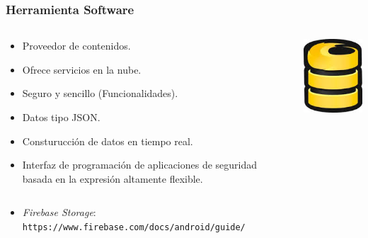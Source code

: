 \begin{frame}
	\frametitle{Herramienta Software}
	\begin{columns}
		\begin{column}{0.6\textwidth}
			\begin{itemize}
				\item Proveedor de contenidos.
				\item Ofrece servicios en la nube.
				\item Seguro y sencillo (Funcionalidades).
				\item Datos tipo JSON.
				\item Consturucción de datos en tiempo real.
				\item Interfaz de programación de aplicaciones de seguridad basada en la expresión altamente flexible.
			\end{itemize}
			\endblock{}
		\end{column}
		\begin{column}{0.4\textwidth}
			\vfill 
			\begin{center}
				\includegraphics[width=0.8\linewidth]{Images/logos/firebase_logo}
			\end{center}
		\end{column}
	\end{columns}
		\begin{itemize}
			\item {\it Firebase Storage}: \\ {\texttt{https://www.firebase.com/docs/android/guide/}}
		\end{itemize}
	\endblock{}
\end{frame}

